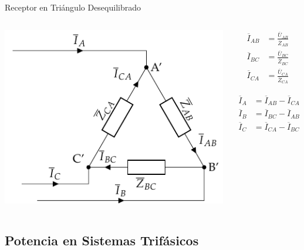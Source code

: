 \documentclass[xcolor={usenames,svgnames,dvipsnames}]{beamer}
\begin{document}
\begin{frame}[label={sec:org0265388}]{Receptor en Triángulo Desequilibrado}
\begin{columns}
\begin{column}{0.6\columnwidth}
\begin{center}
\includegraphics[width=.9\linewidth]{figs/TrianguloDesequilibrado_Receptor.pdf}
\end{center}
\end{column}

\begin{column}{0.4\columnwidth}
\begin{align*}
  \overline{I}_{AB} &= \frac{\overline{U}_{AB}}{\overline{Z}_{AB}}\\
  \overline{I}_{BC} &= \frac{\overline{U}_{BC}}{\overline{Z}_{BC}}\\
  \overline{I}_{CA} &= \frac{\overline{U}_{CA}}{\overline{Z}_{CA}}
\end{align*}

\begin{align*}
  \overline{I}_A &= \overline{I}_{AB} - \overline{I}_{CA}\\
  \overline{I}_B &= \overline{I}_{BC} - \overline{I}_{AB}\\
  \overline{I}_C &= \overline{I}_{CA} - \overline{I}_{BC}\\
\end{align*}
\end{column}
\end{columns}
\end{frame}

\subsection{Potencia en Sistemas Trifásicos}
\label{sec:org5f366f6}
\end{document}
